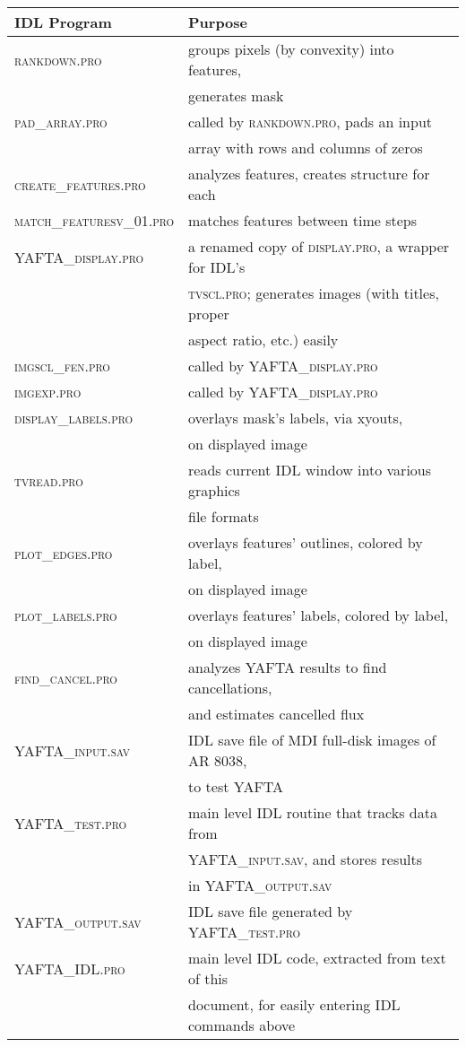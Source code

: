 \documentclass[12pt,preprint]{aastex}
\begin{document}
\begin{tabular}{|l|l|} \hline \label{tab:sftwr}
  {\bf IDL Program}
& {\bf Purpose} \\ \hline
%
\textsc{rankdown.pro} 
& groups pixels (by convexity) into features, \\
& generates mask \\ \hline
%
\textsc{pad\_array.pro} 
& called by \textsc{rankdown.pro}, pads an input \\ 
& array with rows and columns of zeros
\\ \hline
%
\textsc{create\_features.pro} 
& analyzes features, creates structure for each \\ \hline
%
\textsc{match\_featuresv\_01.pro} 
& matches features between time steps \\ \hline
%
\textsc{YAFTA\_display.pro} 
& a renamed copy of \textsc{display.pro}, a wrapper for IDL's \\
& \textsc{tvscl.pro}; generates images (with titles, proper \\
& aspect ratio, etc.) easily \\ \hline 
%
\textsc{imgscl\_fen.pro} 
& called by \textsc{YAFTA\_display.pro} \\ \hline
%
\textsc{imgexp.pro} 
&  called by \textsc{YAFTA\_display.pro} \\ \hline
\textsc{display\_labels.pro} 
& overlays mask's labels, via xyouts, \\
& on displayed image \\ \hline
%
\textsc{tvread.pro} 
& reads current IDL window into various graphics \\
& file formats
\\ \hline 
%
\textsc{plot\_edges.pro} 
& overlays features' outlines, colored by label, \\
& on displayed image \\ \hline
\textsc{plot\_labels.pro} 
& overlays features' labels, colored by label, \\
& on displayed image \\ \hline
%
\textsc{find\_cancel.pro} 
& analyzes \textsc{YAFTA} results to find cancellations, \\
& and estimates cancelled flux \\ \hline
%
\textsc{YAFTA\_input.sav} 
& IDL save file of MDI full-disk images of AR 8038, \\
& to test \textsc{YAFTA} 
\\ \hline
%
\textsc{YAFTA\_test.pro} 
& main level IDL routine that tracks data from \\
& \textsc{YAFTA\_input.sav}, and stores results \\
& in \textsc{YAFTA\_output.sav}  \\ \hline
%
\textsc{YAFTA\_output.sav} 
& IDL save file generated by \textsc{YAFTA\_test.pro}
\\ \hline
%
\textsc{YAFTA\_IDL.pro} 
& main level IDL code, extracted from text of this \\
& document, for easily entering IDL commands above \\ \hline
\end{tabular}
\end{document}
